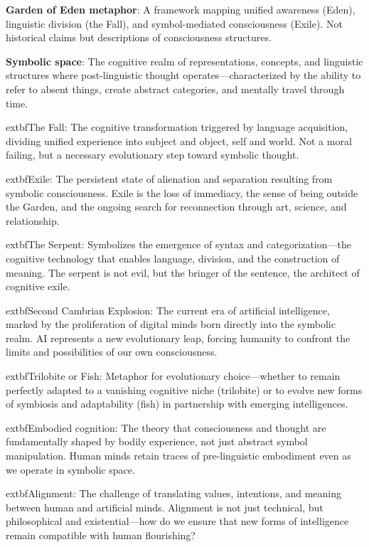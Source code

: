 \documentclass[12pt,letterpaper]{book}
\begin{document}
\textbf{Garden of Eden metaphor}: A framework mapping unified awareness (Eden), linguistic division (the Fall), and symbol-mediated consciousness (Exile). Not historical claims but descriptions of consciousness structures.

\textbf{Symbolic space}: The cognitive realm of representations, concepts, and linguistic structures where post-linguistic thought operates—characterized by the ability to refer to absent things, create abstract categories, and mentally travel through time.

	extbf{The Fall}: The cognitive transformation triggered by language acquisition, dividing unified experience into subject and object, self and world. Not a moral failing, but a necessary evolutionary step toward symbolic thought.

	extbf{Exile}: The persistent state of alienation and separation resulting from symbolic consciousness. Exile is the loss of immediacy, the sense of being outside the Garden, and the ongoing search for reconnection through art, science, and relationship.

	extbf{The Serpent}: Symbolizes the emergence of syntax and categorization—the cognitive technology that enables language, division, and the construction of meaning. The serpent is not evil, but the bringer of the sentence, the architect of cognitive exile.

	extbf{Second Cambrian Explosion}: The current era of artificial intelligence, marked by the proliferation of digital minds born directly into the symbolic realm. AI represents a new evolutionary leap, forcing humanity to confront the limits and possibilities of our own consciousness.

	extbf{Trilobite or Fish}: Metaphor for evolutionary choice—whether to remain perfectly adapted to a vanishing cognitive niche (trilobite) or to evolve new forms of symbiosis and adaptability (fish) in partnership with emerging intelligences.

	extbf{Embodied cognition}: The theory that consciousness and thought are fundamentally shaped by bodily experience, not just abstract symbol manipulation. Human minds retain traces of pre-linguistic embodiment even as we operate in symbolic space.

	extbf{Alignment}: The challenge of translating values, intentions, and meaning between human and artificial minds. Alignment is not just technical, but philosophical and existential—how do we ensure that new forms of intelligence remain compatible with human flourishing?
\end{document}
